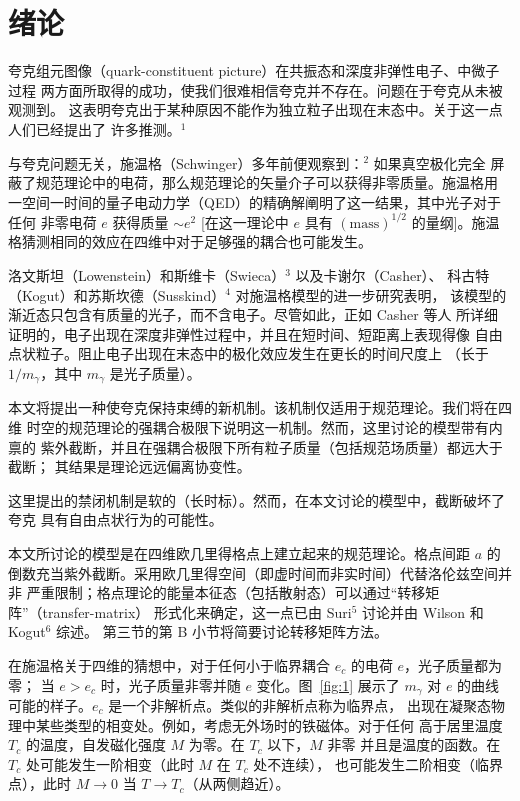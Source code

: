 \section{绪论}\label{sec:intro}

夸克组元图像（quark-constituent picture）在共振态和深度非弹性电子、中微子过程
两方面所取得的成功，使我们很难相信夸克并不存在。问题在于夸克从未被观测到。
这表明夸克出于某种原因不能作为独立粒子出现在末态中。关于这一点人们已经提出了
许多推测。${}^{1}$

与夸克问题无关，施温格（Schwinger）多年前便观察到：${}^{2}$ 如果真空极化完全
屏蔽了规范理论中的电荷，那么规范理论的矢量介子可以获得非零质量。施温格用
一空间一时间的量子电动力学（QED）的精确解阐明了这一结果，其中光子对于任何
非零电荷 $e$ 获得质量 $\sim e^{2}$ [在这一理论中 $e$ 具有 $(\mathrm{mass})^{1/2}$
的量纲]。施温格猜测相同的效应在四维中对于足够强的耦合也可能发生。

洛文斯坦（Lowenstein）和斯维卡（Swieca）${}^{3}$ 以及卡谢尔（Casher）、
科古特（Kogut）和苏斯坎德（Susskind）${}^{4}$ 对施温格模型的进一步研究表明，
该模型的渐近态只包含有质量的光子，而不含电子。尽管如此，正如 Casher 等人
所详细证明的，电子出现在深度非弹性过程中，并且在短时间、短距离上表现得像
自由点状粒子。阻止电子出现在末态中的极化效应发生在更长的时间尺度上
（长于 $1/m_{\gamma}$，其中 $m_{\gamma}$ 是光子质量）。

本文将提出一种使夸克保持束缚的新机制。该机制仅适用于规范理论。我们将在四维
时空的规范理论的强耦合极限下说明这一机制。然而，这里讨论的模型带有内禀的
紫外截断，并且在强耦合极限下所有粒子质量（包括规范场质量）都远大于截断；
其结果是理论远远偏离协变性。

这里提出的禁闭机制是软的（长时标）。然而，在本文讨论的模型中，截断破坏了夸克
具有自由点状行为的可能性。

本文所讨论的模型是在四维欧几里得格点上建立起来的规范理论。格点间距 $a$ 的
倒数充当紫外截断。采用欧几里得空间（即虚时间而非实时间）代替洛伦兹空间并非
严重限制；格点理论的能量本征态（包括散射态）可以通过``转移矩阵''（transfer-matrix）
形式化来确定，这一点已由 Suri${}^{5}$ 讨论并由 Wilson 和 Kogut${}^{6}$ 综述。
第三节的第 B 小节将简要讨论转移矩阵方法。

在施温格关于四维的猜想中，对于任何小于临界耦合 $e_{c}$ 的电荷 $e$，光子质量都为零；
当 $e > e_{c}$ 时，光子质量非零并随 $e$ 变化。图~\ref{fig:1} 展示了 $m_{\gamma}$
对 $e$ 的曲线可能的样子。$e_{c}$ 是一个非解析点。类似的非解析点称为临界点，
出现在凝聚态物理中某些类型的相变处。例如，考虑无外场时的铁磁体。对于任何
高于居里温度 $T_{c}$ 的温度，自发磁化强度 $M$ 为零。在 $T_{c}$ 以下，$M$ 非零
并且是温度的函数。在 $T_{c}$ 处可能发生一阶相变（此时 $M$ 在 $T_{c}$ 处不连续），
也可能发生二阶相变（临界点），此时 $M \to 0$ 当 $T \to T_{c}$（从两侧趋近）。

